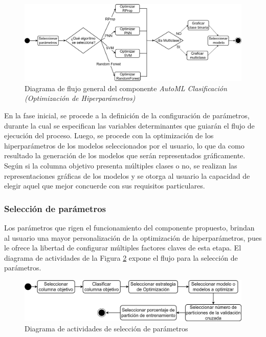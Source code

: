 \begin{figure}[h]
	\centering
	\includegraphics[width=1\linewidth]{"figuras/capi 2/hpo/diagrama-flujo-gral-comp-hpo"}
	\caption[Diagrama de flujo general del componente AutoML Clasificación (Optimización de Hiperparámetros)]{Diagrama de flujo general del componente \textit{AutoML Clasificación (Optimización de Hiperparámetros)}}
	\label{fig:diagrama-flujo-gral-comp-hpo}
\end{figure}

En la fase inicial, se procede a la definición de la configuración de parámetros, durante la cual se especifican las variables determinantes que guiarán el flujo de ejecución del proceso. Luego, se procede con la optimización de los hiperparámetros de los modelos seleccionados por el usuario, lo que da como resultado la generación de los modelos que serán representados gráficamente. Según si la columna objetivo presenta múltiples clases o no, se realizan las representaciones gráficas de los modelos y se otorga al usuario la capacidad de elegir aquel que mejor concuerde con sus requisitos particulares.

\subsubsection*{Selección de parámetros}
Los parámetros que rigen el funcionamiento del componente propuesto, brindan al usuario una mayor personalización de la optimización de hiperparámetros, pues le ofrece la libertad de configurar múltiples factores claves de esta etapa. El diagrama de actividades de la Figura \ref{fig:diagrama-act-selecc-param-hpo} expone el flujo para la selección de parámetros.

\begin{figure}[H]
	\centering
	\includegraphics[width=0.7\linewidth]{"figuras/capi 2/hpo/diagrama-act-selecc-param-hpo"}
	\caption[Diagrama de actividades de selección de parámetros]{Diagrama de actividades de selección de parámetros}
	\label{fig:diagrama-act-selecc-param-hpo}
\end{figure}

